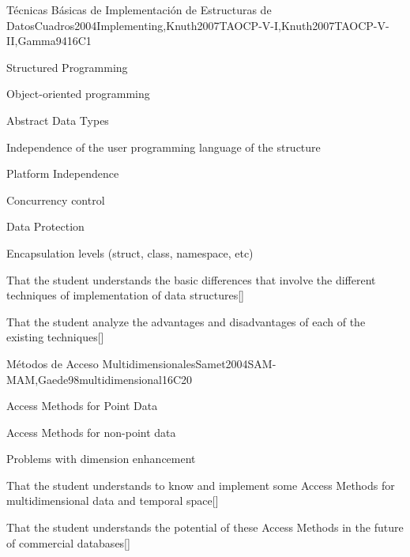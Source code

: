 \begin{syllabus}
\begin{unit}{Técnicas Básicas de Implementación de Estructuras de Datos}{}{Cuadros2004Implementing,Knuth2007TAOCP-V-I,Knuth2007TAOCP-V-II,Gamma94}{16}{C1}
   \begin{topics}
         \item Structured Programming
         \item Object-oriented programming
         \item Abstract Data Types
         \item Independence of the user programming language of the structure
         \item Platform Independence
         \item Concurrency control
         \item Data Protection
         \item Encapsulation levels (struct, class, namespace, etc)
   \end{topics}
   \begin{learningoutcomes}
         \item That the student understands the basic differences that involve the different techniques of implementation of data structures[\Usage]
         \item That the student analyze the advantages and disadvantages of each of the existing techniques[\Usage]
   \end{learningoutcomes}
\end{unit}

\begin{unit}{Métodos de Acceso Multidimensionales}{}{Samet2004SAM-MAM,Gaede98multidimensional}{16}{C20}
   \begin{topics}
         \item Access Methods for Point Data
         \item Access Methods for non-point data
         \item Problems with dimension enhancement
   \end{topics}
   \begin{learningoutcomes}
         \item That the student understands to know and implement some Access Methods for multidimensional data and temporal space[\Usage]
         \item That the student understands the potential of these Access Methods in the future of commercial databases[\Usage]
   \end{learningoutcomes}
\end{unit}


\end{syllabus}
